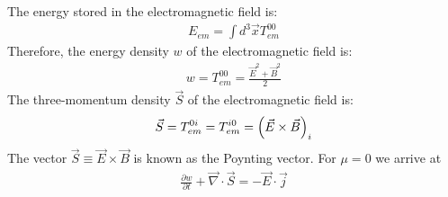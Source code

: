 The energy stored in the electromagnetic field is:
\begin{align*}
    E_{em} = \int d^3 \vec{x} T_{em}^{00}
\end{align*}
Therefore, the energy density $w$ of the electromagnetic field is:
\begin{align*}
    w = T_{em}^{00} = \frac{\vec{E}^2 + \vec{B}^2}{2}
\end{align*}
The three-momentum density $\vec{S}$ of the electromagnetic field is:
\begin{align*}
    \vec{S} = T_{em}^{0i} = T_{em}^{i0} = \left( \vec{E} \times \vec{B} \right)_i
\end{align*}
The vector $\vec{S} \equiv \vec{E} \times \vec{B}$ is known as the
Poynting vector. For $\mu=0$ we arrive at
\begin{align*}
    \frac{\partial w}{\partial t} + \vec{\nabla} \cdot \vec{S}
    = - \vec{E} \cdot \vec{j}
\end{align*}
